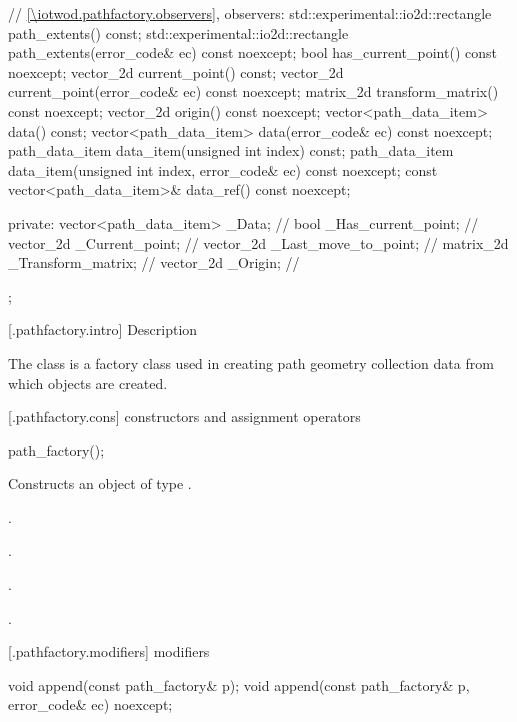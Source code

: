\begin{codeblock}
{{{{{    // \ref{\iotwod.pathfactory.observers}, observers:
    std::experimental::io2d::rectangle path_extents() const;
    std::experimental::io2d::rectangle path_extents(error_code& ec) const noexcept;
    bool has_current_point() const noexcept;
    vector_2d current_point() const;
    vector_2d current_point(error_code& ec) const noexcept;
    matrix_2d transform_matrix() const noexcept;
    vector_2d origin() const noexcept;
    vector<path_data_item> data() const;
    vector<path_data_item> data(error_code& ec) const noexcept;
    path_data_item data_item(unsigned int index) const;
    path_data_item data_item(unsigned int index, error_code& ec) const noexcept;
    const vector<path_data_item>& data_ref() const noexcept;

  private:
    vector<path_data_item> _Data;  // \expos
    bool _Has_current_point;       // \expos
    vector_2d _Current_point;      // \expos
    vector_2d _Last_move_to_point; // \expos
    matrix_2d _Transform_matrix;   // \expos
    vector_2d _Origin;             // \expos
  };
} } } }
\end{codeblock}

 [\iotwod.pathfactory.intro] { Description}

\pnum
{}
The  class is a factory class used in creating path geometry collection data from which  objects are created.

 [\iotwod.pathfactory.cons] { constructors and 
assignment operators}

\begin{itemdecl}
    path_factory();
\end{itemdecl}
\begin{itemdescr}
	\pnum
	\effects
	Constructs an object of type .
	
	\pnum
	\postconditions
	.
	
	\pnum
	.
	
	\pnum
	.
	
	\pnum
	.
	
\end{itemdescr}

 [\iotwod.pathfactory.modifiers] { modifiers}

\begin{itemdecl}
    void append(const path_factory& p);
    void append(const path_factory& p, error_code& ec) noexcept;
\end{itemdecl}
\begin{itemdescr}
	\pnum
	\postconditions
	
\end{itemdescr}

